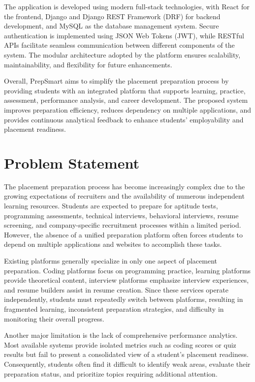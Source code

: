The application is developed using modern full-stack technologies, with React for the frontend, Django and Django REST Framework (DRF) for backend development, and MySQL as the database management system. Secure authentication is implemented using JSON Web Tokens (JWT), while RESTful APIs facilitate seamless communication between different components of the system. The modular architecture adopted by the platform ensures scalability, maintainability, and flexibility for future enhancements.

Overall, PrepSmart aims to simplify the placement preparation process by providing students with an integrated platform that supports learning, practice, assessment, performance analysis, and career development. The proposed system improves preparation efficiency, reduces dependency on multiple applications, and provides continuous analytical feedback to enhance students' employability and placement readiness.

\section{Problem Statement}

The placement preparation process has become increasingly complex due to the growing expectations of recruiters and the availability of numerous independent learning resources. Students are expected to prepare for aptitude tests, programming assessments, technical interviews, behavioral interviews, resume screening, and company-specific recruitment processes within a limited period. However, the absence of a unified preparation platform often forces students to depend on multiple applications and websites to accomplish these tasks.

Existing platforms generally specialize in only one aspect of placement preparation. Coding platforms focus on programming practice, learning platforms provide theoretical content, interview platforms emphasize interview experiences, and resume builders assist in resume creation. Since these services operate independently, students must repeatedly switch between platforms, resulting in fragmented learning, inconsistent preparation strategies, and difficulty in monitoring their overall progress.

Another major limitation is the lack of comprehensive performance analytics. Most available systems provide isolated metrics such as coding scores or quiz results but fail to present a consolidated view of a student's placement readiness. Consequently, students often find it difficult to identify weak areas, evaluate their preparation status, and prioritize topics requiring additional attention.

